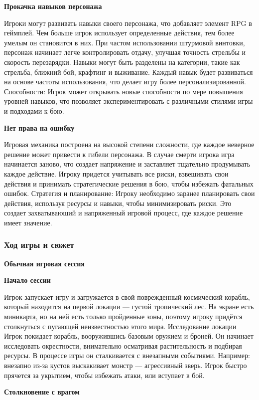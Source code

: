 \documentclass[a4paper,12pt]{article}
\begin{document}
\textbf{Прокачка навыков персонажа}

Игроки могут развивать навыки своего персонажа, что добавляет элемент RPG в геймплей. Чем больше игрок использует определенные действия, тем более умелым он становится в них.
При частом использовании штурмовой винтовки, персонаж начинает легче контролировать отдачу, улучшая точность стрельбы и скорость перезарядки.
Навыки могут быть разделены на категории, такие как стрельба, ближний бой, крафтинг и выживание. Каждый навык будет развиваться на основе частоты использования, что делает игру более персонализированной.
Способности:
Игрок может открывать новые способности по мере повышения уровней навыков, что позволяет экспериментировать с различными стилями игры и подходами к бою.

\textbf{Нет права на ошибку}

Игровая механика построена на высокой степени сложности, где каждое неверное решение может привести к гибели персонажа.
В случае смерти игрока игра начинается заново, что создает напряжение и заставляет тщательно продумывать каждое действие.
Игроку придется учитывать все риски, взвешивать свои действия и принимать стратегические решения в бою, чтобы избежать фатальных ошибок.
Стратегия и планирование:
Игроку необходимо заранее планировать свои действия, используя ресурсы и навыки, чтобы минимизировать риски. Это создает захватывающий и напряженный игровой процесс, где каждое решение имеет значение.
\subsubsection{Ход игры и сюжет}
\begin{center}
 \textbf{Обычная игровая сессия} 
\end{center}
\textbf{Начало сессии}

Игрок запускает игру и загружается в свой поврежденный космический корабль, который находится на первой локации — густой тропический лес. На экране есть миникарта, но на ней есть только пройденные зоны, поэтому игроку придётся столкнуться с пугающей неизвестностью этого мира.
Исследование локации
Игрок покидает корабль, вооружившись базовым оружием и броней. Он начинает исследовать окрестности, внимательно осматривая растительность и подбирая ресурсы. В процессе игры он сталкивается с внезапными событиями. Например: внезапно из-за кустов выскакивает монстр — агрессивный зверь. Игрок быстро прячется за укрытием, чтобы избежать атаки, или вступает в бой.

\textbf{Столкновение с врагом}
\end{document}
